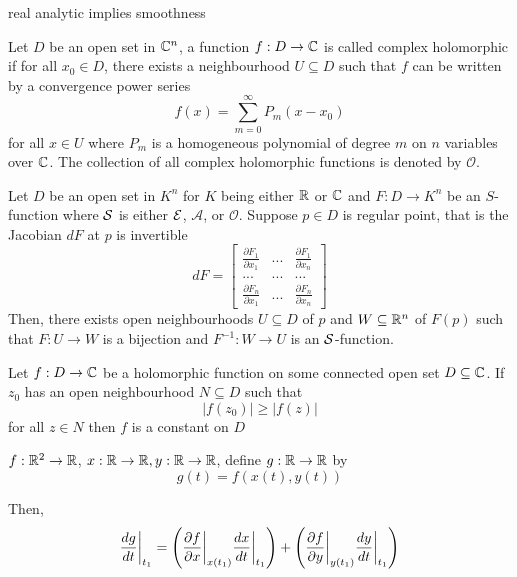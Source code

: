\begin{remark}
	real analytic implies smoothness
\end{remark}

\begin{definition}
	Let $D$ be an open set in $\C^n$, a function $f: D \to \C$ is called complex holomorphic if for all $x_0 \in D$, there exists a neighbourhood $U \subseteq D$ such that $f$ can be written by a convergence power series
	$$
	f(x) = \sum_{m=0}^\infty P_m(x - x_0)
	$$
	for all $x \in U$ where $P_m$ is a homogeneous polynomial of degree $m$ on $n$ variables over $\C$. The collection of all complex holomorphic functions is denoted by $\mathcal{O}$.
\end{definition}

\begin{theorem}
	Let $D$ be an open set in $K^n$ for $K$ being either $\R$ or $\C$ and $F: D \to K^n$ be an $S$-function where $\Str$ is either $\E$, $\mathcal{A}$, or $\mathcal{O}$. Suppose $p \in D$ is regular point, that is the Jacobian $dF$ at $p$ is invertible
	$$
	dF = \begin{bmatrix}
		\frac{\partial F_1}{\partial x_1} & ... & \frac{\partial F_1}{\partial x_n} \\
		... & ... & ... \\
		\frac{\partial F_n}{\partial x_1} & ... & \frac{\partial F_n}{\partial x_n}
	\end{bmatrix}
	$$
	Then, there exists open neighbourhoods $U \subseteq D$ of $p$ and $W \subseteq \R^n$ of $F(p)$ such that $F: U \to W$ is a bijection and $F^{-1}: W \to U$ is an $\Str$-function.
\end{theorem}

\begin{theorem}
	Let $f: D \to \C$ be a holomorphic function on some connected open set $D \subseteq \C$. If $z_0$ has an open neighbourhood $N \subseteq D$ such that
	$$
	|f(z_0)| \geq |f(z)|
	$$
	for all $z \in N$ then $f$ is a constant on $D$
\end{theorem}

\begin{proposition}
	$f: \R^2 \to \R$, $x: \R \to \R, y: \R \to \R$, define $g: \R \to \R$ by
	$$
	g(t) = f(x(t), y(t))
	$$
	
	Then,
	$$
	\frac{dg}{dt}\bigg\vert_{t_1} = \tuple*{\frac{\partial f}{\partial x}\bigg\vert_{x(t_1)} \frac{dx}{dt}\bigg\vert_{t_1}} + \tuple*{\frac{\partial f}{\partial y}\bigg\vert_{y(t_1)} \frac{dy}{dt}\bigg\vert_{t_1}}
	$$
\end{proposition}

